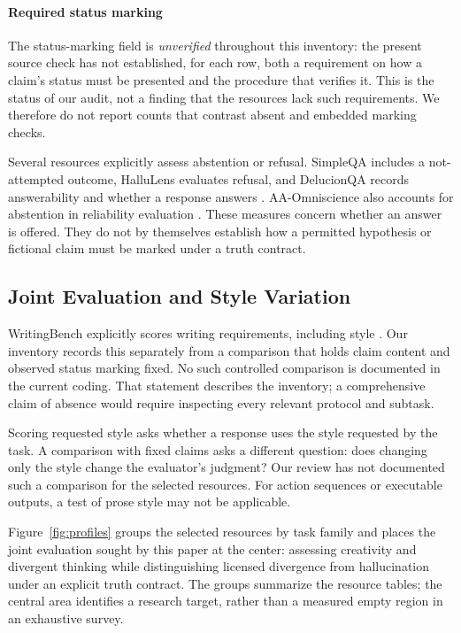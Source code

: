 \paragraph{Required status marking}
The status-marking field is \emph{unverified} throughout this inventory:
the present source check has not established, for each row, both a
requirement on how a claim's status must be presented and the procedure
that verifies it. This is the status of our audit, not a finding that the
resources lack such requirements. We therefore do not report counts that
contrast absent and embedded marking checks.

Several resources explicitly assess abstention or refusal. SimpleQA
includes a not-attempted outcome, HalluLens evaluates refusal, and
DelucionQA records answerability and whether a response answers
\citep{wei_measuring_2024,bang_hallulens_2025,sadat_delucionqa_2023}.
AA-Omniscience also accounts for abstention in reliability evaluation
\citep{jackson_aaomniscience_2025}. These measures concern whether an answer
is offered. They do not by themselves establish how a permitted hypothesis
or fictional claim must be marked under a truth contract.

\subsection{Joint Evaluation and Style Variation}

WritingBench explicitly scores writing requirements, including style
\citep{wu_writingbench_2025}. Our inventory records this separately from a
comparison that holds claim content and observed status marking fixed.
No such controlled comparison is documented in the current coding. That
statement describes the inventory; a comprehensive claim of absence would
require inspecting every relevant protocol and subtask.

Scoring requested style asks whether a response uses the style requested
by the task. A comparison with fixed claims asks a different question:
does changing only the style change the evaluator's judgment? Our review
has not documented such a comparison for the selected resources. For action
sequences or executable outputs, a test of prose style may not be applicable.

Figure~\ref{fig:profiles} groups the selected resources by task family and
places the joint evaluation sought by this paper at the center: assessing
creativity and divergent thinking while distinguishing licensed divergence
from hallucination under an explicit truth contract. The groups summarize
the resource tables; the central area identifies a research target, rather
than a measured empty region in an exhaustive survey.

